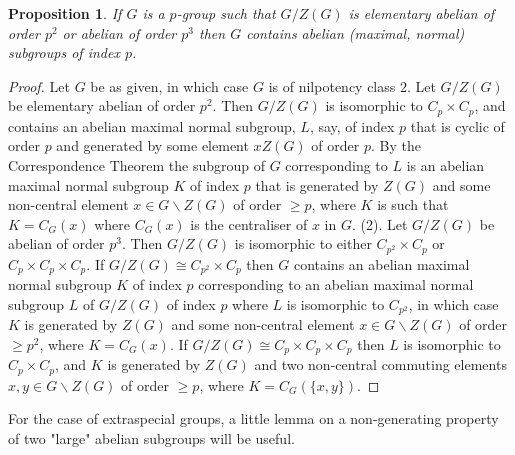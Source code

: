 \documentclass{amsart}
\theoremstyle{observation}
\newtheorem{proposition}[theorem]{Proposition}
\theoremstyle{definition}
\theoremstyle{remark}
\numberwithin{equation}{section}
\begin{document}
\begin{proposition}\label{PropAbCentQuop2p3} If $G$ is a $p$-group such that $G/Z(G)$ is elementary abelian of order $p^2$ or abelian of order $p^3$ then $G$ contains abelian (maximal, normal) subgroups of index $p$.
\end{proposition}
\begin{proof} Let $G$ be as given, in which case $G$ is of nilpotency class $2$. Let $G/Z(G)$ be elementary abelian of order $p^2$. Then $G/Z(G)$ is isomorphic to $C_p \times C_p$, and contains an abelian maximal normal subgroup, $L$, say, of index $p$ that is cyclic of order $p$ and generated by some element $xZ(G)$ of order $p$. By the Correspondence Theorem the subgroup of $G$ corresponding to $L$ is an abelian maximal normal subgroup $K$ of index $p$ that is generated by $Z(G)$ and some non-central element $x \in G\backslash Z(G)$ of order $\geq p$, where $K$ is such that $K = C_G(x)$ where $C_G(x)$ is the centraliser of $x$ in $G$. \textup{(2)}. Let $G/Z(G)$ be abelian of order $p^3$. Then $G/Z(G)$ is isomorphic to either $C_{p^2} \times C_p$ or $C_p \times C_p \times C_p$. If $G/Z(G) \cong C_{p^2} \times C_p$ then $G$ contains an abelian maximal normal subgroup $K$ of index $p$ corresponding to an abelian maximal normal subgroup $L$ of $G/Z(G)$ of index $p$ where $L$ is isomorphic to $C_{p^2}$, in which case $K$ is generated by $Z(G)$ and some non-central element $x \in G \backslash Z(G)$ of order $\geq p^2$, where $K = C_G(x)$. If $G/Z(G) \cong C_p \times C_p \times C_p$ then $L$ is isomorphic to $C_p \times C_p$, and $K$ is generated by $Z(G)$ and two non-central commuting elements $x, y \in G \backslash Z(G)$ of order $\geq p$, where $K = C_G(\{x, y\})$.
\end{proof}

For the case of extraspecial groups, a little lemma on a non-generating property of two "large" abelian subgroups will be useful.
\end{document}
